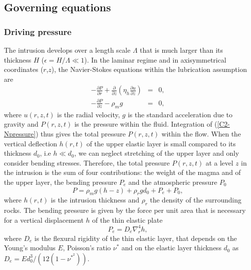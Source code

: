 \subsection{Governing equations}
\label{C2-sec:Governing equation}

\subsubsection*{Driving pressure}

The  intrusion develops  over a  length scale  $\Lambda$ that  is much
larger than its thickness $H$ ($\epsilon = H/ \Lambda \ll 1$).  In the
laminar  regime  and  in  axisymmetrical  coordinates  ($r$,$z$),  the
Navier-Stokes equations within the lubrication assumption are
\begin{eqnarray}
  -\frac{\partial P}{\partial r}  +  \frac{\partial}{\partial z}\left(\eta_h \frac{\partial u}{\partial z}\right) &=&0,\label{C2_V1} \\
  -\frac{\partial P}{\partial z}  - \rho_{m}g&  =&0,\label{C2-Npressure}
\end{eqnarray}
where  $u(r,z,t)$  is  the  radial   velocity,  $g$  is  the  standard
acceleration due to gravity and  $P(r,z,t)$ is the pressure within the
fluid.   Integration  of  (\ref{C2-Npressure}) thus  gives  the  total
pressure  $P(r,z,t)$ within  the flow.   When the  vertical deflection
$h(r,t)$ of the upper elastic layer is small compared to its thickness
$d_0$, i.e $h \ll d_0$, we can neglect stretching of the upper layer and
only  consider  bending  stresses.    Therefore,  the  total  pressure
$P(r,z,t)$  at  a level  $z$  in  the intrusion  is  the  sum of  four
contributions: the  weight of the  magma and  of the upper  layer, the
bending pressure $P_e$ and the atmospheric pressure $P_0$
\begin{equation}
  P = \rho_m g (h-z)+\rho_rg d_0+P_e+P_0,
  \label{C2-pression}
\end{equation}
where $h(r,t)$ is the intrusion  thickness and $\rho_r$ the density of
the surrounding rocks. The bending pressure  is given by the force per
unit area  that is necessary  for a  vertical displacement $h$  of the
thin elastic plate \citep{Turcotte:1982ca}
\begin{equation}
  P_e = D_e\nabla_r^4h,
\end{equation}
where $D_e$  is the flexural  rigidity of  the thin elastic  layer, that
depends on the Young's modulus $E$, Poisson's ratio $\nu^*$ and on the
elastic           layer          thickness           $d_0$          as
$D_e = Ed_0^3/\left(12(1-\nu^*^2)\right)$.

